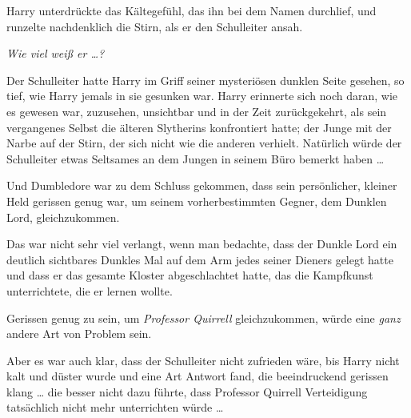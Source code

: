 Harry unterdrückte das Kältegefühl, das ihn bei dem Namen durchlief, und runzelte nachdenklich die Stirn, als er den Schulleiter ansah.

\emph{Wie viel weiß er …?}

Der Schulleiter hatte Harry im Griff seiner mysteriösen dunklen Seite gesehen, so tief, wie Harry jemals in sie gesunken war. Harry erinnerte sich noch daran, wie es gewesen war, zuzusehen, unsichtbar und in der Zeit zurückgekehrt, als sein vergangenes Selbst die älteren Slytherins konfrontiert hatte; der Junge mit der Narbe auf der Stirn, der sich nicht wie die anderen verhielt. Natürlich würde der Schulleiter etwas Seltsames an dem Jungen in seinem Büro bemerkt haben …

Und Dumbledore war zu dem Schluss gekommen, dass sein persönlicher, kleiner Held gerissen genug war, um seinem vorherbestimmten Gegner, dem Dunklen Lord, gleichzukommen.

Das war nicht sehr viel verlangt, wenn man bedachte, dass der Dunkle Lord ein deutlich sichtbares Dunkles Mal auf dem Arm jedes seiner Dieners gelegt hatte und dass er das gesamte Kloster abgeschlachtet hatte, das die Kampfkunst unterrichtete, die er lernen wollte.

Gerissen genug zu sein, um \emph{Professor Quirrell} gleichzukommen, würde eine \emph{ganz} andere Art von Problem sein.

Aber es war auch klar, dass der Schulleiter nicht zufrieden wäre, bis Harry nicht kalt und düster wurde und eine Art Antwort fand, die beeindruckend gerissen klang … die besser nicht dazu führte, dass Professor Quirrell Verteidigung tatsächlich nicht mehr unterrichten würde …

